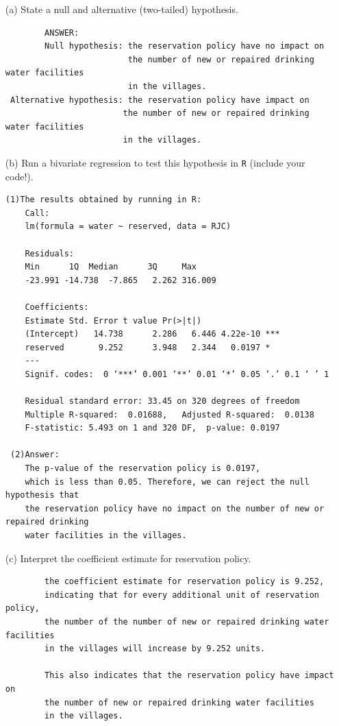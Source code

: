 \documentclass[12pt,letterpaper]{article}
\begin{document}
\newpage
\begin{enumerate}
	\item [(a)] State a null and alternative (two-tailed) hypothesis. 
	\begin{verbatim}
		ANSWER:
		Null hypothesis: the reservation policy have no impact on 
		                 the number of new or repaired drinking water facilities 
		                 in the villages.
 Alternative hypothesis: the reservation policy have impact on 
		                the number of new or repaired drinking water facilities 
		                in the villages.
	\end{verbatim}
	
	\vspace{1cm}
	\item [(b)] Run a bivariate regression to test this hypothesis in \texttt{R} (include your code!).


\begin{verbatim}
(1)The results obtained by running in R:
    Call:
    lm(formula = water ~ reserved, data = RJC)

    Residuals:
    Min      1Q  Median      3Q     Max 
    -23.991 -14.738  -7.865   2.262 316.009 

    Coefficients:
    Estimate Std. Error t value Pr(>|t|)    
    (Intercept)   14.738      2.286   6.446 4.22e-10 ***
    reserved       9.252      3.948   2.344   0.0197 *  
    ---
    Signif. codes:  0 ‘***’ 0.001 ‘**’ 0.01 ‘*’ 0.05 ‘.’ 0.1 ‘ ’ 1
 
    Residual standard error: 33.45 on 320 degrees of freedom
    Multiple R-squared:  0.01688,	Adjusted R-squared:  0.0138 
    F-statistic: 5.493 on 1 and 320 DF,  p-value: 0.0197

 (2)Answer:
    The p-value of the reservation policy is 0.0197, 
    which is less than 0.05. Therefore, we can reject the null hypothesis that 
    the reservation policy have no impact on the number of new or repaired drinking 
    water facilities in the villages.
\end{verbatim}
	
	\vspace{2cm}
	\item [(c)] Interpret the coefficient estimate for reservation policy. 
	\begin{verbatim}
		the coefficient estimate for reservation policy is 9.252, 
		indicating that for every additional unit of reservation policy, 
		the number of the number of new or repaired drinking water facilities 
		in the villages will increase by 9.252 units.
		
		This also indicates that the reservation policy have impact on 
		the number of new or repaired drinking water facilities 
		in the villages.
	\end{verbatim}
\end{enumerate}
\end{document}
